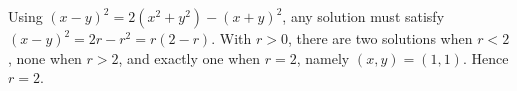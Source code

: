 Using $(x-y)^2=2(x^2+y^2)-(x+y)^2$, any solution must satisfy $(x-y)^2=2r-r^2=r(2-r)$. With $r>0$, there are two solutions when $r<2$, none when $r>2$, and exactly one when $r=2$, namely $(x,y)=(1,1)$. Hence $\boxed{r=2}$.
